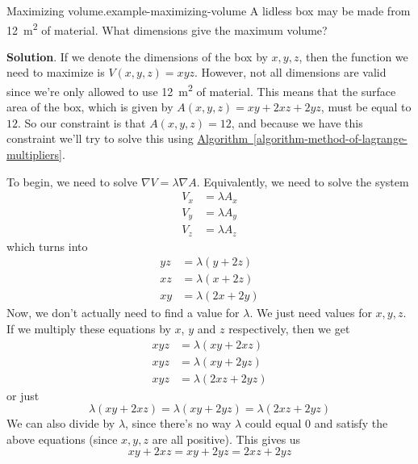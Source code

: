\documentclass[10pt,]{book}
\numberwithin{equation}{section}
\newcommand{\grad}{\nabla}
\begin{document}
\begin{example}{Maximizing volume.}{example-maximizing-volume}%
\hypertarget{p-1442}{}%
A lidless box may be made from \SI{12}{\meter\tothe{2}} of material. What dimensions give the maximum volume?%
\par\smallskip%
\noindent\textbf{Solution}.\hypertarget{solution-235}{}\quad%
\hypertarget{p-1443}{}%
If we denote the dimensions of the box by \(x,y,z\), then the function we need to maximize is \(V(x,y,z) = xyz\). However, not all dimensions are valid since we're only allowed to use \SI{12}{\meter\tothe{2}} of material. This means that the surface area of the box, which is given by \(A(x,y,z) = xy + 2xz + 2yz\), must be equal to \(12\). So our constraint is that \(A(x,y,z) = 12\), and because we have this constraint we'll try to solve this using \hyperref[algorithm-method-of-lagrange-multipliers]{Algorithm~\ref{algorithm-method-of-lagrange-multipliers}}.%
\par
\hypertarget{p-1444}{}%
To begin, we need to solve \(\grad V = \lambda \grad A\). Equivalently, we need to solve the system%
\begin{align*}
V_{x} & = \lambda A_{x} \\
V_{y} & = \lambda A_{y} \\
V_{z} & = \lambda A_{z} 
\end{align*}
which turns into%
\begin{align*}
yz & = \lambda(y + 2z) \\
xz & = \lambda(x + 2z) \\
xy & = \lambda(2x + 2y) 
\end{align*}
Now, we don't actually need to find a value for \(\lambda\). We just need values for \(x,y,z\). If we multiply these equations by \(x\), \(y\) and \(z\) respectively, then we get%
\begin{align*}
xyz & = \lambda(xy + 2xz) \\
xyz & = \lambda(xy + 2yz) \\
xyz & = \lambda(2xz + 2yz) 
\end{align*}
or just%
\begin{equation*}
\lambda(xy + 2xz) = \lambda(xy + 2yz) = \lambda(2xz + 2yz)
\end{equation*}
We can also divide by \(\lambda\), since there's no way \(\lambda\) could equal \(0\) and satisfy the above equations (since \(x,y,z\) are all positive). This gives us%
\begin{equation}
xy + 2xz = xy + 2yz = 2xz + 2yz\label{equation-lagrange-example-1}
\end{equation}

\end{example}
\end{document}
